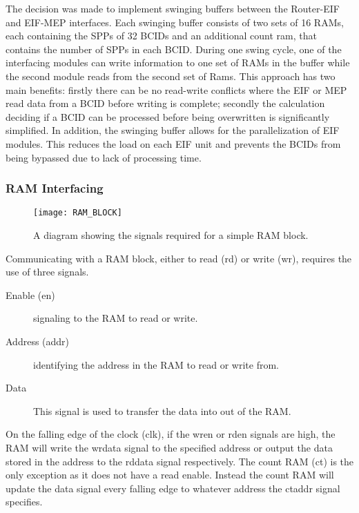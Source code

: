 		The decision was made to implement swinging buffers between the Router-EIF and EIF-MEP interfaces.
		Each swinging buffer consists of two sets of 16 RAMs, each containing the SPPs of 32 BCIDs and an additional count ram, that contains the number of SPPs in each BCID.
		During one swing cycle, one of the interfacing modules can write information to one set of RAMs in the buffer while the second module reads from the second set of Rams.
		This approach has two main benefits: firstly there can be no read-write conflicts where the EIF or MEP read data from a BCID before writing is complete; secondly the calculation deciding if a BCID can be processed before being overwritten is significantly simplified.
		In addition, the swinging buffer allows for the parallelization of EIF modules.
		This reduces the load on each EIF unit and prevents the BCIDs from being bypassed due to lack of processing time.

		\subsubsection{RAM Interfacing} %
		\label{sub:ram_interfacing}
			
			\begin{figure}[ht]
				\centering
				\texttt{[image: RAM\_BLOCK]}
				\caption{A diagram showing the signals required for a simple RAM block.}
				\label{fig:ram_diagram}
			\end{figure}

			Communicating with a RAM block, either to read (rd) or write (wr), requires the use of three signals.

			\begin{description}
				\item [Enable (en)] signaling to the RAM to read or write.
				\item [Address (addr)] identifying the address in the RAM to read or write from.
				\item [Data] This signal is used to transfer the data into out of the RAM.
			\end{description}

			On the falling edge of the clock (clk), if the wr\textunderscore en or rd\textunderscore en signals are high, the RAM will write the wr\textunderscore data signal to the specified address or output the data stored in the address to the rd\textunderscore data signal respectively. 
			The count RAM (ct) is the only exception as it does not have a read enable.
			Instead the count RAM will update the data signal every falling edge to whatever address the ct\textunderscore addr signal specifies.


